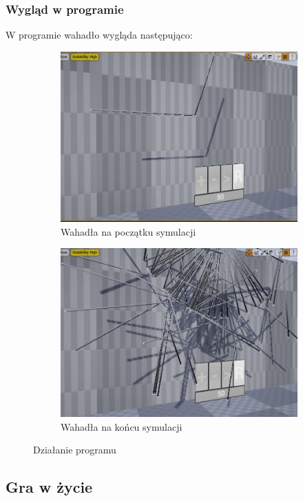 \documentclass[a4paper,12pt,reqno]{article}
\begin{document}
\subsubsection{Wygląd w programie}
W programie wahadło wygląda następująco:


\begin{figure}[H]%
	\centering
	\begin{subfigure}{.5\textwidth}
		\centering
		\includegraphics[width=0.8\linewidth]{graphics/PendulumInUE_1.png}
		\caption{Wahadła na początku symulacji}	
		\label{ref:subref_a}
	\end{subfigure}%
	\begin{subfigure}{.5\textwidth}
		\centering
		\includegraphics[width=0.8\linewidth]{graphics/PendulumInUE_2.png}
		\caption{Wahadła na końcu symulacji}
		\label{ref:subref_b}
	\end{subfigure}%
	

\caption{Działanie programu}
\label{ref:ref}
\end{figure}

\subsection{Gra w życie}
\end{document}
